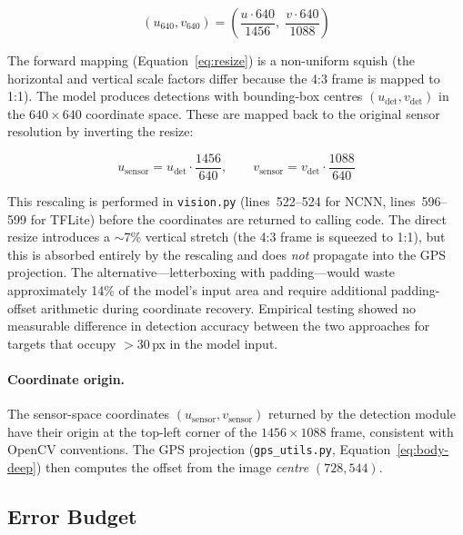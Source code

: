 \begin{equation}\label{eq:resize}
  (u_{640}, v_{640}) = \left(\frac{u \cdot 640}{1456},\; \frac{v \cdot 640}{1088}\right)
\end{equation}

\noindent The forward mapping (Equation~\ref{eq:resize}) is a non-uniform squish (the horizontal and vertical scale factors differ because the 4:3 frame is mapped to 1:1).  The model produces detections with bounding-box centres $(u_\mathrm{det}, v_\mathrm{det})$ in the $640 \times 640$ coordinate space.  These are mapped back to the original sensor resolution by inverting the resize:

\begin{equation}\label{eq:unscale}
  u_\mathrm{sensor} = u_\mathrm{det} \cdot \frac{1456}{640},
  \qquad
  v_\mathrm{sensor} = v_\mathrm{det} \cdot \frac{1088}{640}
\end{equation}

\noindent This rescaling is performed in \texttt{vision.py} (lines~522--524 for NCNN, lines~596--599 for TFLite) before the coordinates are returned to calling code.  The direct resize introduces a $\sim$7\% vertical stretch (the 4:3 frame is squeezed to 1:1), but this is absorbed entirely by the rescaling and does \emph{not} propagate into the GPS projection.  The alternative---letterboxing with padding---would waste approximately 14\% of the model's input area and require additional padding-offset arithmetic during coordinate recovery.  Empirical testing showed no measurable difference in detection accuracy between the two approaches for targets that occupy $>$30\,px in the model input.

\paragraph{Coordinate origin.}  The sensor-space coordinates $(u_\mathrm{sensor}, v_\mathrm{sensor})$ returned by the detection module have their origin at the top-left corner of the $1456 \times 1088$ frame, consistent with OpenCV conventions.  The GPS projection (\texttt{gps\_utils.py}, Equation~\ref{eq:body-deep}) then computes the offset from the image \emph{centre} $(728, 544)$.

\subsection{Error Budget}\label{sec:error-budget}

